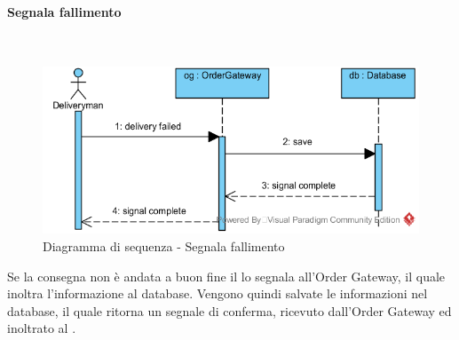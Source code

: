 \begin{samepage}
\paragraph{Segnala fallimento}\mbox{}\\
\end{samepage}
\begin{figure}[H]
	\centering
	\includegraphics[width=15cm]{../../documenti/SpecificaTecnica/diagrammi_img/sequenza/fattorino_fallimento_consegna.png}
	\caption{Diagramma di sequenza - Segnala fallimento}
\end{figure}
Se la consegna non è andata a buon fine il \Deliveryman{} lo segnala all'Order Gateway, il quale inoltra l'informazione al database. Vengono quindi salvate le informazioni nel database, il quale ritorna un segnale di conferma, ricevuto dall'Order Gateway ed inoltrato al \Deliveryman{}.

\subsubsection{\Purchasingmanager{}}

